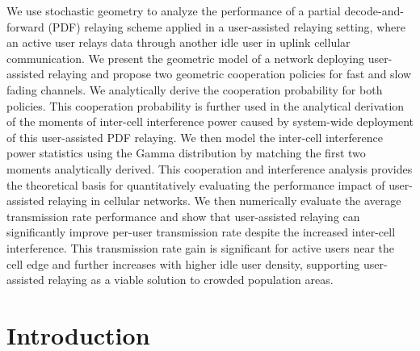 
We use stochastic geometry to analyze the performance of a partial decode-and-forward (PDF) relaying scheme applied in a user-assisted relaying setting, where an active user relays data through another idle user in uplink cellular communication. We present the geometric model of a network deploying user-assisted relaying and propose two geometric cooperation policies for fast and slow fading channels. We analytically derive the cooperation probability for both policies. This cooperation
probability is further used in the analytical derivation of the
moments of inter-cell interference power caused by system-wide
deployment of this user-assisted PDF relaying. We then model the
inter-cell interference power statistics using the Gamma distribution by matching the first two moments analytically derived. This
cooperation and interference analysis provides the theoretical
basis for quantitatively evaluating the performance impact of
user-assisted relaying in cellular networks. We then numerically
evaluate the average transmission rate performance and show
that user-assisted relaying can significantly improve per-user
transmission rate despite the increased inter-cell interference. This
transmission rate gain is significant for active users near the
cell edge and further increases with higher idle user density,
supporting user-assisted relaying as a viable solution to crowded
population areas.

\section{Introduction}

